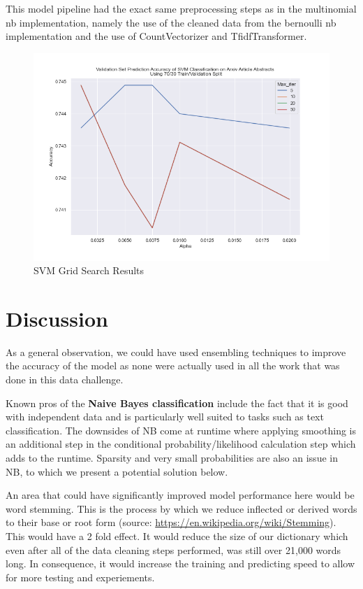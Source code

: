 \documentclass[a4paper,12pt]{article}
\begin{document}
\medskip

This model pipeline had the exact same preprocessing steps as in the multinomial nb implementation, namely the use of the cleaned data from the bernoulli nb implementation and the use of CountVectorizer and TfidfTransformer.

\begin{figure}[H]
    \centering
    \caption{SVM Grid Search Results}
    \includegraphics[width=12cm]{compareSVM.png}    
\end{figure}

\section{Discussion}

As a general observation, we could have used ensembling techniques to improve the accuracy of the model as none were actually used in all the work that was done in this data challenge.

\medskip

Known pros of the \textbf{Naive Bayes classification} include the fact that it is good with independent data and is particularly well suited to tasks such as text classification. The downsides of NB come at runtime where applying smoothing is an additional step in the conditional probability/likelihood calculation step which adds to the runtime. Sparsity and very small probabilities are also an issue in NB, to which we present a potential solution below.

\medskip

An area that could have significantly improved model performance here would be word stemming. This is the process by which we reduce inflected or derived words to their base or root form (source: \url{https://en.wikipedia.org/wiki/Stemming}). This would have a 2 fold effect. It would reduce the size of our dictionary which even after all of the data cleaning steps performed, was still over 21,000 words long. In consequence, it would increase the training and predicting speed to allow for more testing and experiements.
\end{document}
